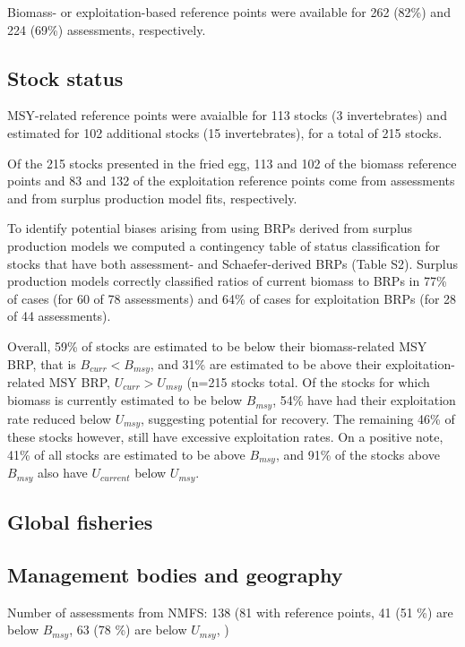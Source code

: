 Biomass- or exploitation-based reference points were available for
262 (82\%) and
224 (69\%)
assessments, respectively.

\subsection*{Stock status}
\noindent

MSY-related reference points were avaialble for
113 stocks
(3 invertebrates) and estimated
for 102 additional stocks
(15 invertebrates), for a total of
215 stocks.

Of the
215 stocks presented in
the fried egg, 113 and
102 of the biomass reference points and
83 and
132 of the exploitation reference
points come from assessments and from surplus production model fits,
respectively.

To identify potential biases arising from using BRPs
derived from surplus production models we computed a contingency table
of status classification for stocks that have both assessment- and
Schaefer-derived BRPs (Table S2). Surplus production models correctly
classified ratios of current biomass to BRPs in
77\% of cases (for 60
of 78 assessments) and 64\%
of cases for exploitation BRPs (for 28 of
44 assessments).

Overall, 59\% of stocks are estimated
to be below their biomass-related MSY BRP, that is $B_{curr}<B_{msy}$,
and 31\% are estimated to be above
their exploitation-related MSY BRP, $U_{curr}>U_{msy}$
(n=215 stocks total.
Of the stocks for which biomass is currently estimated to be below
$B_{msy}$, 54\% have had their
exploitation rate reduced below $U_{msy}$, suggesting potential for
recovery. The remaining
46\% of these stocks however,
still have excessive exploitation rates. On a positive note,
41\% of all stocks are estimated to
be above $B_{msy}$, and 91\%
of the stocks above $B_{msy}$ also have $U_{current}$ below $U_{msy}$.


\subsection*{Global fisheries}

\subsection*{Management bodies and geography}
\noindent
Number of assessments from NMFS: 138 (81 with reference points, 41 (51 \%) are below $B_{msy}$, 63 (78 \%) are below $U_{msy}$, ) \\

